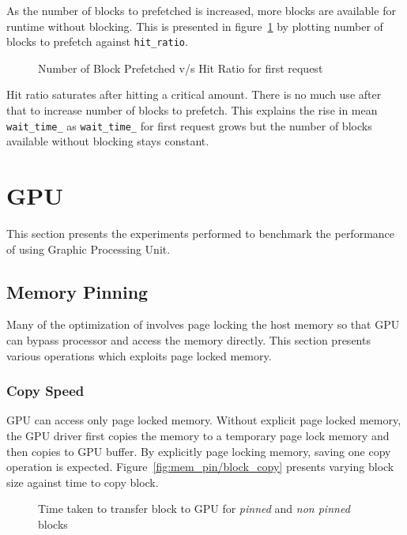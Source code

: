 As the number of blocks to prefetched is increased, more blocks are available for
runtime without blocking. This is presented in figure~\ref{fig:look_ahead_hit_ratio}
by plotting number of blocks to prefetch against \texttt{hit\_ratio}.

\begin{figure}[h]
  
  \caption{Number of Block Prefetched v/s Hit Ratio for first request}
  \label{fig:look_ahead_hit_ratio}
\end{figure}

Hit ratio saturates after hitting a critical amount. There is no much use after
that to increase number of blocks to prefetch. This explains the rise in mean
\texttt{wait\_time\_} as \texttt{wait\_time\_} for first request grows but the
number of blocks available without blocking stays constant.

\section{GPU}
This section presents the experiments performed to benchmark the performance of
using Graphic Processing Unit.
\subsection{Memory Pinning}
Many of the optimization of involves page locking the host memory so that GPU can
bypass processor and access the memory directly. This section presents various
operations which exploits page locked memory.
\subsubsection{Copy Speed}
GPU can access only page locked memory. Without explicit page locked memory, the
GPU driver first copies the memory to a temporary page lock memory and then copies
to GPU buffer. By explicitly page locking memory, saving one copy operation is expected.
Figure~\ref{fig:mem_pin/block_copy} presents varying block size against time to
copy block.

\begin{figure}[h]
  
  \caption{Time taken to transfer block to GPU for \textit{pinned} and \textit{non pinned} blocks}
  \label{fig:mempin_block_copy}
\end{figure}

